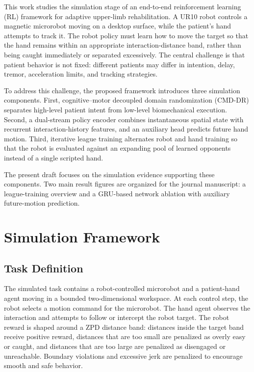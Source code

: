 \documentclass[lettersize,journal]{IEEEtran}
\begin{document}
This work studies the simulation stage of an end-to-end reinforcement learning (RL) framework for adaptive upper-limb rehabilitation. A UR10 robot controls a magnetic microrobot moving on a desktop surface, while the patient's hand attempts to track it. The robot policy must learn how to move the target so that the hand remains within an appropriate interaction-distance band, rather than being caught immediately or separated excessively. The central challenge is that patient behavior is not fixed: different patients may differ in intention, delay, tremor, acceleration limits, and tracking strategies.

To address this challenge, the proposed framework introduces three simulation components. First, cognitive--motor decoupled domain randomization (CMD-DR) separates high-level patient intent from low-level biomechanical execution. Second, a dual-stream policy encoder combines instantaneous spatial state with recurrent interaction-history features, and an auxiliary head predicts future hand motion. Third, iterative league training alternates robot and hand training so that the robot is evaluated against an expanding pool of learned opponents instead of a single scripted hand.

The present draft focuses on the simulation evidence supporting these components. Two main result figures are organized for the journal manuscript: a league-training overview and a GRU-based network ablation with auxiliary future-motion prediction.

\section{Simulation Framework}
\subsection{Task Definition}
The simulated task contains a robot-controlled microrobot and a patient-hand agent moving in a bounded two-dimensional workspace. At each control step, the robot selects a motion command for the microrobot. The hand agent observes the interaction and attempts to follow or intercept the robot target. The robot reward is shaped around a ZPD distance band: distances inside the target band receive positive reward, distances that are too small are penalized as overly easy or caught, and distances that are too large are penalized as disengaged or unreachable. Boundary violations and excessive jerk are penalized to encourage smooth and safe behavior.
\end{document}

